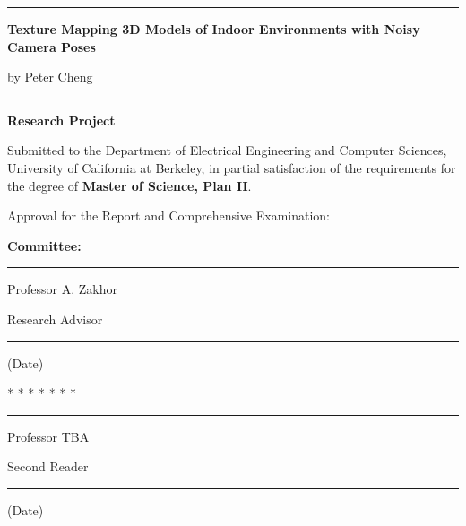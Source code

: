 \documentclass[12pt]{article}
\def\title{Texture Mapping 3D Models of Indoor Environments with Noisy Camera Poses}
\def\author{Peter Cheng}
\def\signatureA{Professor A. Zakhor}
\def\signatureB{Professor TBA}
\begin{document}
\thispagestyle{empty}

\begin{center}
\rule{5.5in}{0.40mm}

\vspace{0.35in}
\large{\bf\title{}}

\vspace{0.25in}
{\large by \author{}}

\vspace{0.35in}
\rule{5.5in}{0.40mm}

\vspace{0.5in}
{\large {\bf Research Project}}
\end{center}

Submitted to the Department of Electrical Engineering and
Computer Sciences, University of California at Berkeley,
in partial satisfaction of the requirements for the degree
of {\bf Master of Science, Plan II}.

\vspace{0.25in}
Approval for the Report and Comprehensive Examination:

\begin{center}
{\bf Committee:}

\vspace{0.25in}
\rule{3.5in}{0.25mm}

\signatureA

Research Advisor

\vspace{0.25in}
\rule{3.5in}{0.25mm}

(Date)

\vspace{0.25in}
* * * * * * *

\vspace{0.25in}
\rule{3.5in}{0.25mm}

\signatureB

Second Reader

\vspace{0.25in}
\rule{3.5in}{0.25mm}

(Date)
\end{center}
\end{document}
